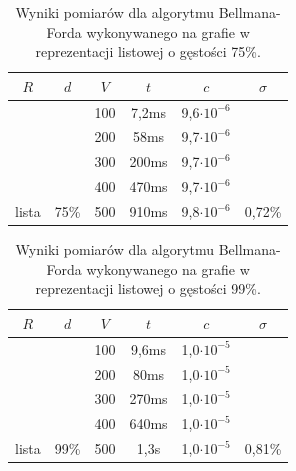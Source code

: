 \documentclass[a4paper,12pt]{article}
\begin{document}
\begin{table}[H]
	\centering
	\caption{\centering Wyniki pomiarów dla algorytmu Bellmana-Forda wykonywanego na grafie w reprezentacji listowej o gęstości 75\%.}
	\begin{tabular}{|c|c|c|c|c|c|}
		\hline
		\rowcolor[HTML]{C0C0C0} 
		$R$                     & $d$                    & $V$ & $t$   & $c$                & $\sigma$                 \\ \hline
		&                        & 100 & 7,2ms & 9,6$\cdot 10^{-6}$ &                          \\ \cline{3-5}
		&                        & 200 & 58ms  & 9,7$\cdot 10^{-6}$ &                          \\ \cline{3-5}
		&                        & 300 & 200ms & 9,7$\cdot 10^{-6}$ &                          \\ \cline{3-5}
		&                        & 400 & 470ms & 9,7$\cdot 10^{-6}$ &                          \\ \cline{3-5}
		\multirow{-5}{*}{lista} & \multirow{-5}{*}{75\%} & 500 & 910ms & 9,8$\cdot 10^{-6}$ & \multirow{-5}{*}{0,72\%} \\ \hline
	\end{tabular}
\end{table}

\begin{table}[H]
	\centering
	\caption{\centering Wyniki pomiarów dla algorytmu Bellmana-Forda wykonywanego na grafie w reprezentacji listowej o gęstości 99\%.}
	\begin{tabular}{|c|c|c|c|c|c|}
		\hline
		\rowcolor[HTML]{C0C0C0} 
		$R$                     & $d$                    & $V$ & $t$   & $c$                & $\sigma$                 \\ \hline
		&                        & 100 & 9,6ms & 1,0$\cdot 10^{-5}$ &                          \\ \cline{3-5}
		&                        & 200 & 80ms  & 1,0$\cdot 10^{-5}$ &                          \\ \cline{3-5}
		&                        & 300 & 270ms & 1,0$\cdot 10^{-5}$ &                          \\ \cline{3-5}
		&                        & 400 & 640ms & 1,0$\cdot 10^{-5}$ &                          \\ \cline{3-5}
		\multirow{-5}{*}{lista} & \multirow{-5}{*}{99\%} & 500 & 1,3s  & 1,0$\cdot 10^{-5}$ & \multirow{-5}{*}{0,81\%} \\ \hline
	\end{tabular}
\end{table}
\end{document}
